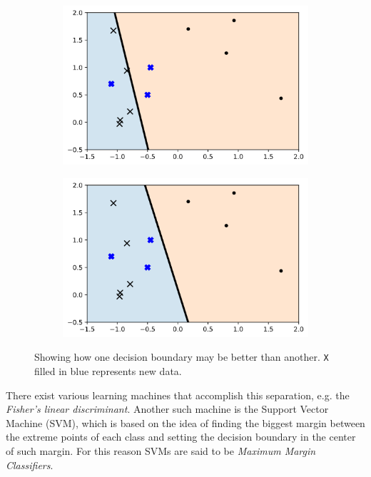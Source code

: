 \begin{figure}[H]
    \centering
    \begin{subfigure}[b]{0.4\linewidth}
        \includegraphics[width=\linewidth]{img/ch4/boundrybad.png}
    \end{subfigure}
    \begin{subfigure}[b]{0.4\linewidth}
        \includegraphics[width=\linewidth]{img/ch4/boundrygood.png}
    \end{subfigure}
    \caption[Not all correctly separating boundaries are equally good]{Showing how one decision boundary may be better than another. \texttt{X} filled in blue represents new data.}
    \label{fig:ch4.sep1}
\end{figure}

There exist various learning machines that accomplish this separation, e.g. the \emph{Fisher’s linear discriminant}. Another such machine is the Support Vector Machine (SVM), which is based on the idea of finding the biggest margin between the extreme points of each class and setting the decision boundary in the center of such margin. For this reason SVMs are said to be \emph{Maximum Margin Classifiers}.


